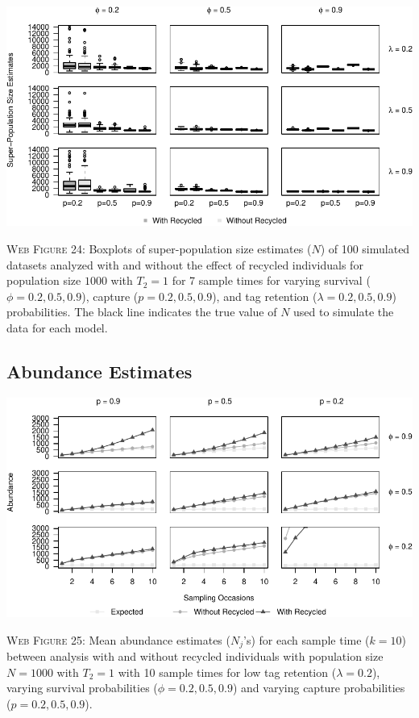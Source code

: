 \documentclass[]{article}
\begin{document}
\includegraphics{Appendix_BW_files/figure-latex/figure24_superN_GJSTL6-1.pdf}

\textsc{Web Figure 24:} Boxplots of super-population size estimates
(\(N\)) of 100 simulated datasets analyzed with and without the effect
of recycled individuals for population size \(1000\) with \(T_2=1\) for
7 sample times for varying survival (\(\phi=0.2,0.5,0.9\)), capture
(\(p=0.2,0.5,0.9\)), and tag retention (\(\lambda=0.2,0.5,0.9\))
probabilities. The black line indicates the true value of \(N\) used to
simulate the data for each model.

\newpage

\subsection{Abundance Estimates}\label{abundance-estimates}

\includegraphics{Appendix_BW_files/figure-latex/25_abundance_L_GJSTL1-1.pdf}

\textsc{Web Figure 25:} Mean abundance estimates (\(N_j\)'s) for each
sample time (\(k=10\)) between analysis with and without recycled
individuals with population size \(N=1000\) with \(T_2=1\) with 10 sample times for low tag retention (\(\lambda=0.2\)), varying survival
probabilities (\(\phi=0.2,0.5,0.9\)) and varying capture probabilities
(\(p=0.2,0.5,0.9\)).
\end{document}
